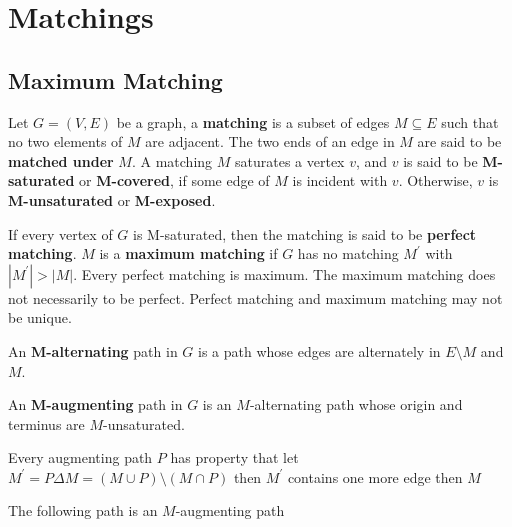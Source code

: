 		\chapter{Matchings}
			\section{Maximum Matching}
				\begin{definition}[Matching]
					Let $G = (V, E)$ be a graph, a \textbf{matching} is a subset of edges $M \subseteq E$ such that no two elements of $M$ are adjacent. The two ends of an edge in $M$ are said to be \textbf{matched under} $M$. A matching $M$ saturates a vertex $v$, and $v$ is said to be \textbf{M-saturated} or \textbf{M-covered}, if some edge of $M$ is incident with $v$. Otherwise, $v$ is \textbf{M-unsaturated} or \textbf{M-exposed}.
				\end{definition}

				\begin{definition}
					If every vertex of $G$ is M-saturated, then the matching is said to be \textbf{perfect matching}. $M$ is a \textbf{maximum matching} if $G$ has no matching $M^\prime$ with $|M^\prime| > |M|$. Every perfect matching is maximum. The maximum matching does not necessarily to be perfect. Perfect matching and maximum matching may not be unique.
				\end{definition}

				\begin{definition}[M-alternating]
					An \textbf{M-alternating} path in $G$ is a path whose edges are alternately in $E\setminus M$ and $M$.
				\end{definition}

				\begin{definition}[M-augmenting]
					An \textbf{M-augmenting} path in $G$ is an $M$-alternating path whose origin and terminus are $M$-unsaturated.
				\end{definition}

				\begin{lemma}
					Every augmenting path $P$ has property that let $M^\prime = P\Delta M = (M \cup P) \setminus (M \cap P)$ then $M^\prime$ contains one more edge then $M$
				\end{lemma}

				The following path is an $M$-augmenting path
				\begin{figure}[!ht]
					\centering
				\end{figure}

